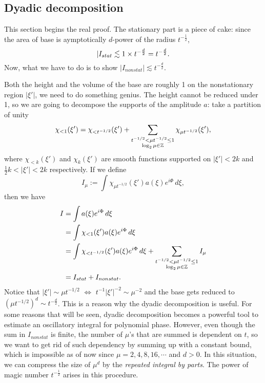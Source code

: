 \documentclass{../exp}
\begin{document}
\subsection{Dyadic decomposition}
This section begins the real proof.
The stationary part is a piece of cake: since the area of base is aymptotically $d$-power of the radius $t^{-\frac12}$,
\[|I_{stat}\lesssim 1\times t^{-\frac d2}=t^{-\frac d2}.\]
Now, what we have to do is to show $|I_{nonstat}|\lesssim t^{-\frac d2}$.

Both the height and the volume of the base are roughly 1 on the nonstationary region $|\xi'|$, we need to do something genius.
The height cannot be reduced under 1, so we are going to decompose the supports of the amplitude $a$: take a partition of unity
\[\chi_{<1}(\xi')=\chi_{<t^{-1/2}}(\xi')+\sum_{\substack{t^{-1/2}<\mu t^{-1/2}\le1\\ \log_2\mu\in\mathbb{Z}}}\chi_{\mu t^{-1/2}}(\xi'),\]
where $\chi_{<k}(\xi')$ and $\chi_k(\xi')$ are smooth functions supported on $|\xi'|<2k$ and $\frac12k<|\xi'|<2k$ respectively.
If we define
\[I_\mu:=\int\chi_{\mu t^{-1/2}}(\xi')a(\xi)e^{i\Phi}\,d\xi,\]
then we have
\begin{align*}
I&=\int a(\xi)e^{i\Phi}\,d\xi\\
&=\int\chi_{<1}(\xi')a(\xi)e^{i\Phi}\,d\xi\\
&=\int\chi_{<t^{-1/2}}(\xi')a(\xi)e^{i\Phi}\,d\xi+\sum_{\substack{t^{-1/2}<\mu t^{-1/2}\le1\\ \log_2\mu\in\mathbb{Z}}}I_\mu\\
&=I_{stat}+I_{nonstat}.
\end{align*}
Notice that $|\xi'|\sim\mu t^{-1/2}$ $\Leftrightarrow$ $t^{-1}|\xi'|^{-2}\sim\mu^{-2}$ and the base gets reduced to $(\mu t^{-1/2})^d\sim t^{-\frac d2}$.
This is a reason why the dyadic decomposition is useful.
For some reasons that will be seen, dyadic decomposition becomes a powerful tool to estimate an oscillatory integral for polynomial phase.
However, even though the sum in $I_{nonstat}$ is finite, the number of $\mu$'s that are summed is dependent on $t$, so we want to get rid of such dependency by summing up with a constant bound, which is impossible as of now since $\mu=2,4,8,16,\cdots$ and $d>0$.
In this situation, we can compress the size of $\mu^d$ by the \emph{repeated integral by parts}.
The power of magic number $t^{-\frac12}$ arises in this procedure.
\end{document}
